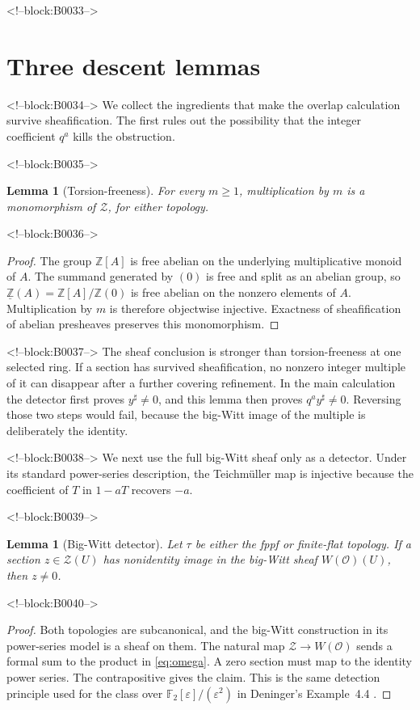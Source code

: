 \documentclass[11pt]{article}
\newtheorem{lemma}[theorem]{Lemma}
\theoremstyle{definition}
\newcommand{\Wbig}{W}
\newcommand{\Zpre}{\underline{\mathbb Z}}
\newcommand{\Zsh}{\mathcal Z}
\newcommand{\sh}{\sharp}
\begin{document}
<!--block:B0033-->
\section{Three descent lemmas}\label{sec:lemmas}

<!--block:B0034-->
We collect the ingredients that make the overlap calculation survive
sheafification.  The first rules out the possibility that the integer
coefficient \(q^a\) kills the obstruction.

<!--block:B0035-->
\begin{lemma}[Torsion-freeness]\label{lem:torsionfree}
For every \(m\geq1\), multiplication by \(m\) is a monomorphism of
\(\Zsh\), for either topology.
\end{lemma}

<!--block:B0036-->
\begin{proof}
The group \(\mathbb Z[A]\) is free abelian on the underlying multiplicative
monoid of \(A\).  The summand generated by \((0)\) is free and split as an
abelian group, so \(\Zpre(A)=\mathbb Z[A]/\mathbb Z(0)\) is free abelian on
the nonzero elements of \(A\).  Multiplication by \(m\) is therefore
objectwise injective.  Exactness of sheafification of abelian presheaves
preserves this monomorphism.
\end{proof}

<!--block:B0037-->
The sheaf conclusion is stronger than torsion-freeness at one selected
ring.  If a section has survived sheafification, no nonzero integer
multiple of it can disappear after a further covering refinement.  In the
main calculation the detector first proves \(y^\sh\ne0\), and this lemma
then proves \(q^a y^\sh\ne0\).  Reversing those two steps would fail,
because the big-Witt image of the multiple is deliberately the identity.

<!--block:B0038-->
We next use the full big-Witt sheaf only as a detector.  Under its standard
power-series description, the Teichm\"uller map is injective because the
coefficient of \(T\) in \(1-aT\) recovers \(-a\).

<!--block:B0039-->
\begin{lemma}[Big-Witt detector]\label{lem:detector}
Let \(\tau\) be either the fppf or finite-flat topology.  If a section
\(z\in\Zsh(U)\) has nonidentity image in the big-Witt sheaf
\(\Wbig(\mathcal O)(U)\), then \(z\ne0\).
\end{lemma}

<!--block:B0040-->
\begin{proof}
Both topologies are subcanonical, and the big-Witt construction in its
power-series model is a sheaf on them.  The natural map
\(\Zsh\to\Wbig(\mathcal O)\) sends a formal sum to the product in
\eqref{eq:omega}.  A zero section must map to the identity power series.
The contrapositive gives the claim.  This is the same detection principle
used for the class over
\(\mathbb F_2[\varepsilon]/(\varepsilon^2)\) in Deninger's
Example~4.4 \cite[p.~22]{Deninger2025Rational}.
\end{proof}
\end{document}
